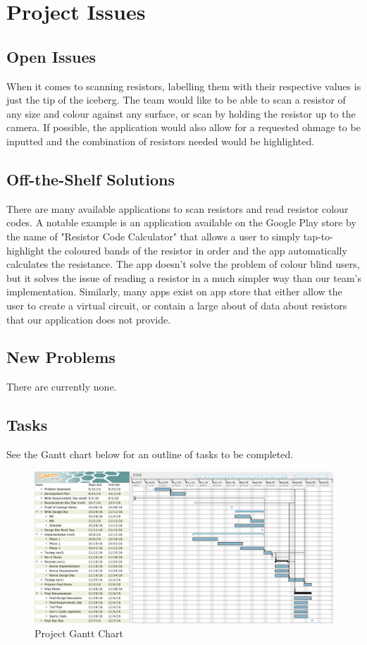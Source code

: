 \documentclass{article}
\begin{document}
\section{Project Issues}

\subsection{Open Issues }
When it comes to scanning resistors, labelling them with their respective values is just the tip of the iceberg. The team would like to be able to scan a resistor of any size and colour against any surface, or scan by holding the resistor up to the camera. If possible, the application would also allow for a requested ohmage to be inputted and the combination of resistors needed would be highlighted.

\subsection{Off-the-Shelf Solutions}
There are many available applications to scan resistors and read resistor colour codes. A notable example is an application available on the Google Play store by the name of "Resistor Code Calculator" that allows a user to simply tap-to-highlight the coloured bands of the resistor in order and the app automatically calculates the resistance. The app doesn't solve the problem of colour blind users, but it solves the issue of reading a resistor in a much simpler way than our team's implementation. Similarly, many apps exist on app store that either allow the user to create a virtual circuit, or contain a large about of data about resistors that our application does not provide.

\subsection{New Problems}
There are currently none.

\subsection{Tasks}
See the Gantt chart below for an outline of tasks to be completed.
\begin{figure}[h]
\centering
\includegraphics[scale=0.3]{gantt}
\caption{Project Gantt Chart}
\end{figure}
\end{document}
